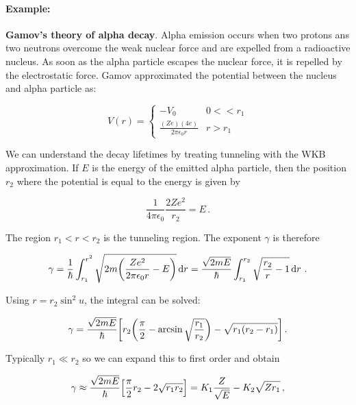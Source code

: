 \documentclass[12pt, titlepage]{article}
\begin{document}
\begin{mdframed}[backgroundcolor=gray!20]
\paragraph*{Example:}
\textbf{Gamov's theory of alpha decay}. Alpha emission occurs when two protons ans two neutrons overcome the weak nuclear force and are expelled from a radioactive nucleus. As soon as the alpha particle escapes the nuclear force, it is repelled by the electrostatic force. Gamov approximated the potential between the nucleus and alpha particle as:

\begin{equation}
	V(r) = \begin{cases}
	-V_0 & 0 < < r_1 \\[4pt]
	\frac{(Ze)(4e)}{2\pi\epsilon_0 r} & r > r_1
	\end{cases}
\end{equation}


We can understand the decay lifetimes by treating tunneling with the WKB approximation. If $E$ is the energy of the emitted alpha particle, then the position $r_2$ where the potential is equal to the energy is given by

\begin{equation}
	\frac{1}{4\pi\epsilon_0}\frac{2Ze^2}{r_2} = E \,.
\end{equation}

The region $r_1<r<r_2$ is the tunneling region. The exponent $\gamma$ is therefore 

\begin{equation*}
	\gamma = \frac{1}{\hbar}\int_{r_1}^{r^2}\sqrt{2m\qty(\frac{Ze^2}{2\pi\epsilon_0 r} - E)}\dd{r} = \frac{\sqrt{2mE}}{\hbar} \int_{r_1}^{r_2}\sqrt{\frac{r_2}{r} - 1} \dd{r} \,.
\end{equation*}

Using $r = r_2\sin^2 u$, the integral can be solved:

\begin{equation}
	\gamma = \frac{\sqrt{2mE}}{\hbar}\qty[r_2\qty(\frac{\pi}{2} - \arcsin\sqrt{\frac{r_1}{r_2}}) - \sqrt{r_1(r_2-r_1)}] \,.
\end{equation}

Typically $r_1 \ll r_2$ so we can expand this to first order and obtain

\begin{equation}
	\gamma \approx \frac{\sqrt{2mE}}{\hbar}\qty[\frac{\pi}{2}r_2 - 2\sqrt{r_1 r_2}] = K_1\frac{Z}{\sqrt{E}} - K_2 \sqrt{Z r_1} \,,
\end{equation}


\end{mdframed}
\end{document}
